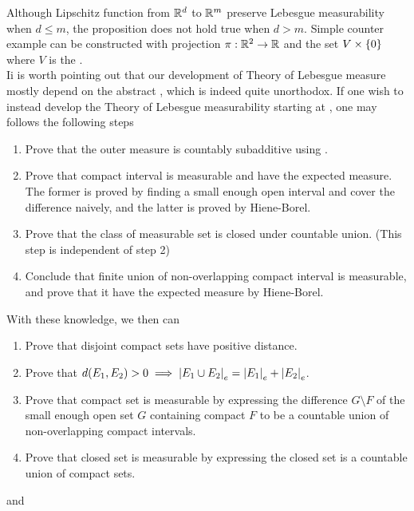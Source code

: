 \documentclass{report}
\begin{document}
\begin{mdframed}
Although Lipschitz function from $\mathbb{R}^d$ to  $\mathbb{R}^m$ preserve Lebesgue measurability when $d\leq m$, the proposition does not hold true when $d>m$.  Simple counter example can be constructed with projection $\pi:\mathbb{R}^2\rightarrow \mathbb{R}$ and the set $V \times \{ 0 \}$ where $V$ is the . \\

  Ii is worth pointing out that our development of Theory of Lebesgue measure mostly depend on the abstract  , which is indeed quite unorthodox. If one wish to instead develop the Theory of Lebesgue measurability starting at , one may follows the following steps 
\begin{enumerate}[label=(\roman*)] 
\item Prove that the outer measure is countably subadditive using .
\item Prove that compact interval is measurable and have the expected measure. The former is proved by finding a small enough open interval and cover the difference naively, and the latter is proved by Hiene-Borel. 
  \item Prove that the class of measurable set is closed under countable union.  (This step is independent of step 2)
  \item Conclude that finite union of non-overlapping compact interval is measurable, and prove that it have the expected measure by Hiene-Borel. 
\end{enumerate}
With these knowledge, we then can 
\begin{enumerate}[label=(\alph*)]
  \item Prove that disjoint compact sets have positive distance. 
  \item Prove that $d(E_1,E_2)>0 \implies \left|E_1\cup E_2\right|_e = \left|E_1\right|_e + \left|E_2\right|_e$.   
  \item Prove that compact set is measurable by expressing the difference $G\setminus F$  of the small enough open set $G$ containing compact $F$ to be a countable union of non-overlapping compact intervals.
  \item Prove that closed set is measurable by expressing the closed set is a countable union of compact sets.
\end{enumerate}
and 
\begin{enumerate}[label=(\roman*)]

\end{enumerate}
\end{mdframed}
\end{document}
